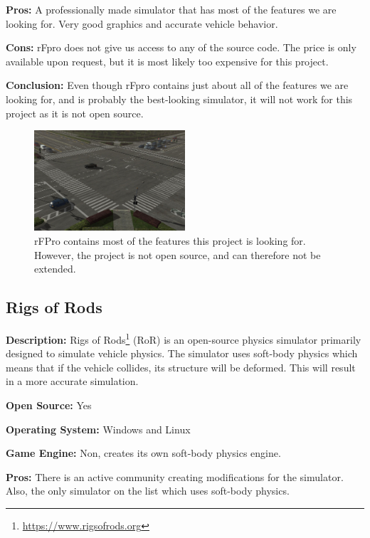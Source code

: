 \textbf{Pros:} A professionally made simulator that has most of the features we are looking for. Very good graphics and accurate vehicle behavior. 

\textbf{Cons:} rFpro does not give us access to any of the source code. The price is only available upon request, but it is most likely too expensive for this project. 

\textbf{Conclusion:} Even though rFpro contains just about all of the features we are looking for, and is probably the best-looking simulator, it will not work for this project as it is not open source. 

\begin{figure}[H]
    \centering
    \includegraphics[width=0.5\textwidth]{03_Background/Appendix/Simulators/rFpro.jpg}
    \caption{rFPro contains most of the features this project is looking for. However, the project is not open source, and can therefore not be extended.}
\end{figure}

\subsection{Rigs of Rods}
\textbf{Description:} Rigs of Rods\footnote{\url{https://www.rigsofrods.org}} (RoR) is an open-source physics simulator primarily designed to simulate vehicle physics. The simulator uses soft-body physics which means that if the vehicle collides, its structure will be deformed. This will result in a more accurate simulation.

\textbf{Open Source:} Yes

\textbf{Operating System:} Windows and Linux

\textbf{Game Engine:} Non, creates its own soft-body physics engine.

\textbf{Pros:} There is an active community creating modifications for the simulator. Also, the only simulator on the list which uses soft-body physics. 

